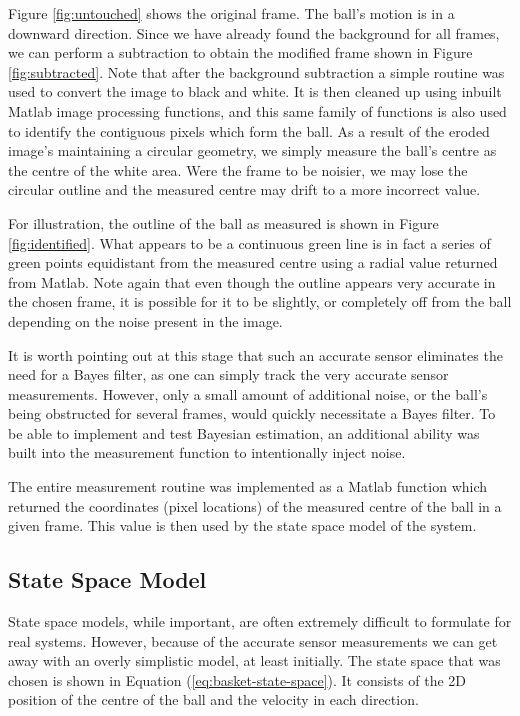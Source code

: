 Figure \ref{fig:untouched} shows the original frame. The ball's motion is in
a downward direction. Since we have already found the background for all frames,
we can perform a subtraction to obtain the modified frame shown in Figure
\ref{fig:subtracted}. Note that after the background subtraction a simple
routine was used to convert the image to black and white.
It is then cleaned up using inbuilt Matlab image processing
functions, and this same family of functions is also used to identify the contiguous
pixels which form the ball. As a result of the eroded image's maintaining
a circular geometry, we simply measure the ball's centre as the centre of the
white area. Were the frame to be noisier, we may lose the circular outline and
the measured centre may drift to a more incorrect value.

For illustration, the outline of the ball as measured is shown in Figure
\ref{fig:identified}. What appears to be a continuous green line is in fact
a series of green points equidistant from the measured centre using a radial
value returned from Matlab. Note again that even though the outline appears
very accurate in the chosen frame, it is possible for it to be slightly, or
completely off from the ball depending on the noise present in the image.

It is worth pointing out at this stage that such an accurate sensor eliminates
the need for a Bayes filter, as one can simply track the very accurate sensor
measurements. However, only a small amount of additional noise, or the ball's
being obstructed for several frames, would quickly necessitate a Bayes filter.
To be able to implement and test Bayesian estimation, an additional ability was
built into the measurement function to intentionally inject noise. 

The entire measurement routine was implemented as a Matlab function which
returned the coordinates (pixel locations) of the measured centre of the ball
in a given frame. This value is then used by the state space model of the system.

\subsection{State Space Model}
State space models, while important, are often extremely difficult to formulate
for real systems. However, because of the accurate sensor measurements we can
get away with an overly simplistic model, at least initially. The state space
that was chosen is shown in Equation (\ref{eq:basket-state-space}). It consists
of the 2D position of the centre of the ball and the velocity in each direction.

